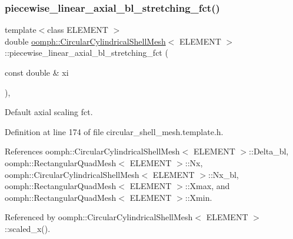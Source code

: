 \mbox{\label{classoomph_1_1CircularCylindricalShellMesh_a5730df8baedd890ca909f31e5452f3db}} 
\subsubsection{\texorpdfstring{piecewise\+\_\+linear\+\_\+axial\+\_\+bl\+\_\+stretching\+\_\+fct()}{piecewise\_linear\_axial\_bl\_stretching\_fct()}}
{\footnotesize\ttfamily template$<$class E\+L\+E\+M\+E\+NT $>$ \\
double \hyperlink{classoomph_1_1CircularCylindricalShellMesh}{oomph\+::\+Circular\+Cylindrical\+Shell\+Mesh}$<$ E\+L\+E\+M\+E\+NT $>$\+::piecewise\+\_\+linear\+\_\+axial\+\_\+bl\+\_\+stretching\+\_\+fct (\begin{DoxyParamCaption}\item[{const double \&}]{xi }\end{DoxyParamCaption})\hspace{0.3cm}{\ttfamily [inline]}, {\ttfamily [private]}}



Default axial scaling fct. 



Definition at line 174 of file circular\+\_\+shell\+\_\+mesh.\+template.\+h.



References oomph\+::\+Circular\+Cylindrical\+Shell\+Mesh$<$ E\+L\+E\+M\+E\+N\+T $>$\+::\+Delta\+\_\+bl, oomph\+::\+Rectangular\+Quad\+Mesh$<$ E\+L\+E\+M\+E\+N\+T $>$\+::\+Nx, oomph\+::\+Circular\+Cylindrical\+Shell\+Mesh$<$ E\+L\+E\+M\+E\+N\+T $>$\+::\+Nx\+\_\+bl, oomph\+::\+Rectangular\+Quad\+Mesh$<$ E\+L\+E\+M\+E\+N\+T $>$\+::\+Xmax, and oomph\+::\+Rectangular\+Quad\+Mesh$<$ E\+L\+E\+M\+E\+N\+T $>$\+::\+Xmin.



Referenced by oomph\+::\+Circular\+Cylindrical\+Shell\+Mesh$<$ E\+L\+E\+M\+E\+N\+T $>$\+::scaled\+\_\+x().

\mbox{\label{classoomph_1_1CircularCylindricalShellMesh_a4fb67c76ca3ad60efadfe2d3aabcfa0b}} 
